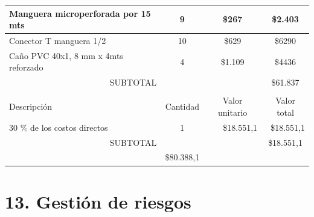 \documentclass[
11pt, %
codirector, %
]{charter}
\begin{document}
\begin{table}[htpb]
\begin{tabularx}{\linewidth}{@{}|X|c|r|r|@{}}
  Manguera microperforada por 15 mts &
  \multicolumn{1}{c|}{9} &
  \multicolumn{1}{c|}{\$267} &
  \multicolumn{1}{c|}{\$2.403} \\ \hline
  
   Conector T manguera 1/2&
  \multicolumn{1}{c|}{10} &
  \multicolumn{1}{c|}{\$629} &
  \multicolumn{1}{c|}{\$6290} \\ \hline
  
  Caño PVC 40x1, 8 mm x 4mts reforzado &
  \multicolumn{1}{c|}{4} &
  \multicolumn{1}{c|}{\$1.109} &
  \multicolumn{1}{c|}{\$4436} \\ \hline 
    
\multicolumn{3}{|c|}{SUBTOTAL} &
  \multicolumn{1}{c|}{\$61.837} \\ \hline
\rowcolor[HTML]{C0C0C0} 
\multicolumn{4}{|c|}{\cellcolor[HTML]{C0C0C0}COSTOS INDIRECTOS} \\ \hline
\rowcolor[HTML]{C0C0C0} 
Descripción &
  \multicolumn{1}{c|}{\cellcolor[HTML]{C0C0C0}Cantidad} &
  \multicolumn{1}{c|}{\cellcolor[HTML]{C0C0C0}Valor unitario} &
  \multicolumn{1}{c|}{\cellcolor[HTML]{C0C0C0}Valor total} \\ \hline
\multicolumn{1}{|l|}{30 \%  de los costos directos} &
  {1} &
  {\$18.551,1} &
  {\$18.551,1} \\ \hline
\multicolumn{3}{|c|}{SUBTOTAL} &
  \multicolumn{1}{c|}{\$18.551,1} \\ \hline
\rowcolor[HTML]{C0C0C0}
\multicolumn{3}{|c|}{TOTAL} & \$80.388,1
   \\ \hline
\end{tabularx}%
\end{table}


\section{13. Gestión de riesgos}
\label{sec:riesgos}
\end{document}
